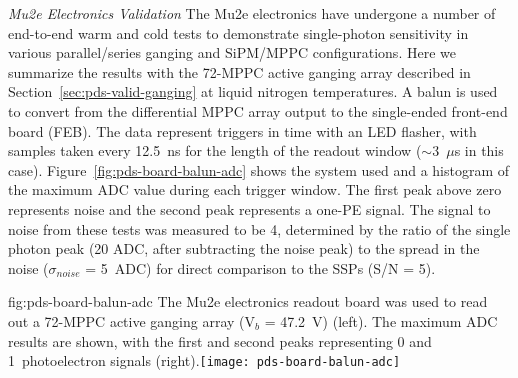 \textit{Mu2e Electronics Validation}
The Mu2e electronics have undergone a number of end-to-end warm and cold tests to demonstrate single-photon sensitivity in various parallel/series ganging and SiPM/MPPC configurations. Here we summarize the results with the 72-MPPC active ganging array described in Section~\ref{sec:pds-valid-ganging}
at liquid nitrogen temperatures. 
A balun is used to convert from the differential MPPC array output to the single-ended front-end board (FEB). The data represent triggers in time with an LED flasher, with samples taken every 12.5~ns for the length of the readout window ($\sim$3~$\mu$s in this case). Figure~\ref{fig:pds-board-balun-adc} shows the system used and a histogram of the maximum ADC value during each trigger window. The first peak above zero represents noise and the second peak represents a one-PE signal. The signal to noise from these tests was measured to be 4, determined by the ratio of the single photon peak (20 ADC, after subtracting the noise peak) to the spread in the noise ($\sigma_{noise}$ = 5~ADC) for direct comparison to the SSPs (S/N = 5).

\begin{dunefigure}
{fig:pds-board-balun-adc}
{The Mu2e electronics readout board was used to read out a 72-MPPC active ganging array (V$_b$ = \SI{47.2}{V}) (left). The maximum ADC results are shown, with the first and second peaks representing 0 and 1~photoelectron signals (right).}\texttt{[image: pds-board-balun-adc]} 
\vspace{-7.0cm}
\end{dunefigure}



